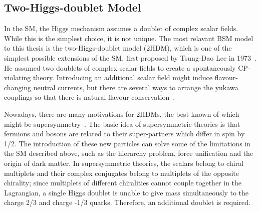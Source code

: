 \subsection{Two-Higgs-doublet Model}
\label{sec:BSM:2HDM}
In the SM, the Higgs mechanism assumes a doublet of complex 
scalar fields. While this is the simplest choice, it is not unique. 
The most relavant BSM model to this thesis is the 
two-Higgs-doublet model (2HDM), which is one of the simplest possible extensions of the SM,
first proposed by Tsung-Dao Lee in 1973~\cite{2HDM-李政道}.
He assumed two doublets of complex scalar fields to create a spontaneously CP-violating theory. 
Introducing an additional scalar field might induce flavour-changing neutral currents,
but there are several ways to arrange the yukawa couplings 
so that there is natural flavour conservation~\cite{Weinberg-FCNC}.

Nowadays, there are many motivations for 2HDMs, the best known 
of which might be supersymmetry~\cite{SUSY}. 
The basic idea of supersymmetric theories is that fermions and bosons 
are related to their super-partners which differ in spin by 1/2. 
The introduction of these new particles can solve some of the limitations
in the SM described above, such as the hierarchy problem, force unification and the 
origin of dark matter. 
In supersymmetric theories, the scalars belong to chiral multiplets and  
their complex conjugates belong to multiplets of the opposite chirality; 
since multiplets of different chiralities cannot couple together in the Lagrangian, a
single Higgs doublet is unable to give mass simultaneously to the charge 2/3 and charge
-1/3 quarks. Therefore, an additional doublet is required. 

